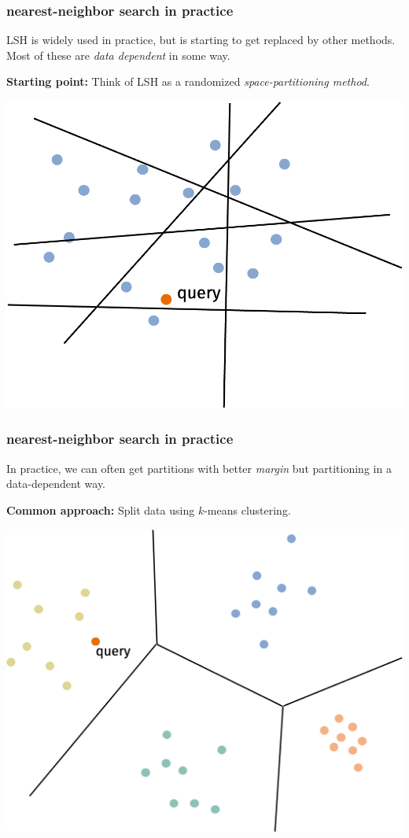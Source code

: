 \documentclass[compress]{beamer}
\begin{document}
\begin{frame}[t]
	\frametitle{nearest-neighbor search in practice}
	LSH is widely used in practice, but is starting to get replaced by other methods. Most of these are \emph{data dependent} in some way. 

	\textbf{Starting point:} Think of LSH as a randomized \emph{space-partitioning method}.
	\begin{center}
	\includegraphics[width=.6\textwidth]{random_space_partition.png}
	\end{center}
\end{frame}

\begin{frame}[t]
	\frametitle{nearest-neighbor search in practice}
In practice, we can often get partitions with better \emph{margin} but partitioning in a data-dependent way. 

	\textbf{Common approach:} Split data using $k$-means clustering. 
	\begin{center}
	\includegraphics[width=.6\textwidth]{kmeans_1.png}
	\end{center}

\end{frame}
\end{document}
